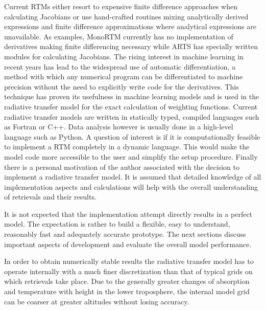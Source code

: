     Current RTMs either resort to expensive finite difference approaches when
    calculating Jacobians or use hand-crafted routines mixing analytically
    derived expressions and finite difference approximations where analytical
    expressions are unavailable. As examples, MonoRTM currently has no
    implementation of derivatives making finite differencing necessary while
    ARTS has specially written modules for calculating Jacobians. The rising
    interest in machine learning in recent years has lead to the widespread use
    of automatic differentiation, a method with which any numerical program can
    be differentiated to machine precision without the need to explicitly write
    code for the derivatives. This technique has proven its usefulness in
    machine learning models and is used in the radiative transfer model for the
    exact calculation of weighting functions.  Current radiative transfer
    models are written in statically typed, compiled languages such as Fortran
    or C++. Data analysis however is usually done in a high-level language such
    as Python. A question of interest is if it is computationally feasible to
    implement a RTM completely in a dynamic language. This would make the model
    code more accessible to the user and simplify the setup procedure. Finally
    there is a personal motivation of the author associated with the decision
    to implement a radiative transfer model. It is assumed that detailed
    knowledge of all implementation aspects and calculations will help with the
    overall understanding of retrievals and their results.

    It is not expected that the implementation attempt directly results in
    a perfect model. The expectation is rather to build a flexible, easy to
    understand, reasonably fast and adequately accurate prototype. The next
    sections discuss important aspects of development and evaluate the
    overall model performance.

\stopsubsection

\startsubsection[title=Numerical Considerations]

    In order to obtain numerically stable results the radiative transfer model
    has to operate internally with a much finer discretization than that of
    typical grids on which retrievals take place. Due to the generally greater
    changes of absorption and temperature with height in the lower troposphere,
    the internal model grid can be coarser at greater altitudes without losing
    accuracy.

